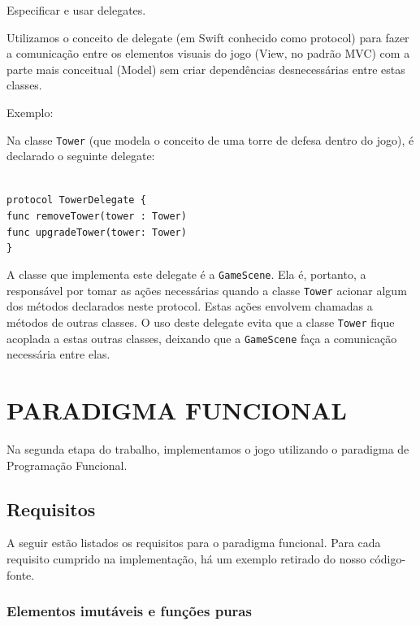 \documentclass[rel_mlp]{iiufrgs}
\newcommand\tab[1][1cm]{\hspace*{#1}}
\begin{document}
Especificar e usar delegates.

Utilizamos o conceito de delegate (em Swift conhecido como protocol) para fazer a comunicação entre os elementos visuais do jogo (View, no padrão MVC) com a parte mais conceitual (Model) sem criar dependências desnecessárias entre estas classes.

Exemplo:

Na classe \texttt{Tower} (que modela o conceito de uma torre de defesa dentro do jogo), é declarado o seguinte delegate:

\texttt{\\ protocol TowerDelegate \{\\\tab func removeTower(tower : Tower)\\\tab func upgradeTower(tower: Tower)\\\}}

A classe que implementa este delegate é a \texttt{GameScene}. Ela é, portanto, a responsável por tomar as ações necessárias quando a classe \texttt{Tower} acionar algum dos métodos declarados neste protocol. Estas ações envolvem chamadas a métodos de outras classes. O uso deste delegate evita que a classe \texttt{Tower} fique acoplada a estas outras classes, deixando que a \texttt{GameScene} faça a comunicação necessária entre elas.

%
\section{PARADIGMA FUNCIONAL}

Na segunda etapa do trabalho, implementamos o jogo utilizando o paradigma de Programação Funcional.


\subsection{Requisitos}

A seguir estão listados os requisitos para o paradigma funcional. Para cada requisito cumprido na implementação, há um exemplo retirado do nosso código-fonte.


\subsubsection{Elementos imutáveis e funções puras}
\end{document}
